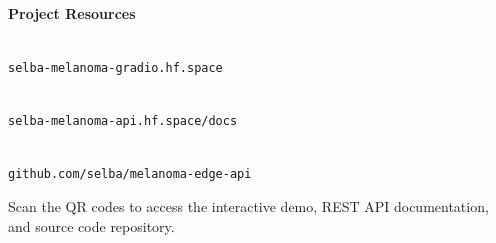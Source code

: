 \documentclass[a4paper,12pt]{report}
\begin{document}
\newcommand{\HRule}{\rule{\linewidth}{0.5mm}}


\newpage ~ \thispagestyle{empty} \newpage


\newpage

\newpage

\newpage

\listoffigures
\newpage
\tableofcontents
\newpage

\setcounter{page}{1}










\appendix



\nocite{*}



\newpage
\thispagestyle{empty}
\vspace*{3cm}
\begin{center}
{\huge \bfseries Project Resources}\\[1.5cm]

\begin{minipage}{0.30\textwidth}
\centering
{}\\[0.5cm]
{\normalsize\texttt{selba-melanoma-gradio.hf.space}}
\end{minipage}
\hfill
\begin{minipage}{0.30\textwidth}
\centering
{}\\[0.5cm]
{\normalsize\texttt{selba-melanoma-api.hf.space/docs}}
\end{minipage}
\hfill
\begin{minipage}{0.30\textwidth}
\centering
{}\\[0.5cm]
{\normalsize\texttt{github.com/selba/melanoma-edge-api}}
\end{minipage}

\vspace{1.5cm}
{\normalsize Scan the QR codes to access the interactive demo, REST API documentation, and source code repository.}

\end{center}
\end{document}
